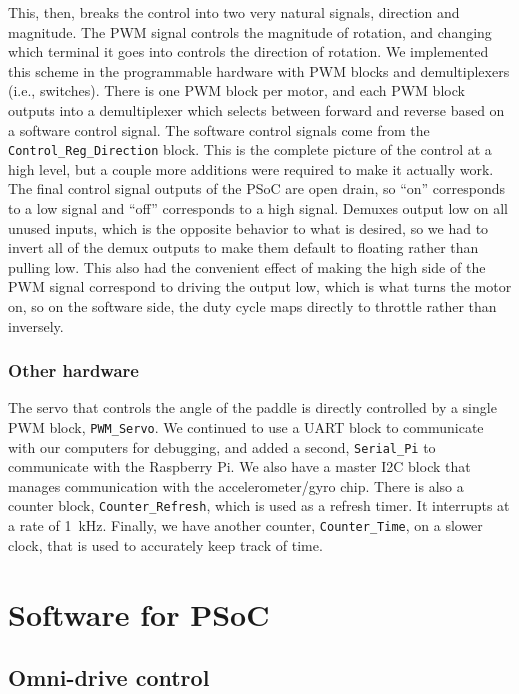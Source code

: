 \documentclass[letterpaper, 11pt]{article}
\begin{document}
\begin{enumerate}[label=\textbf{\arabic*.}]
This, then, breaks the control into two very natural signals, direction and magnitude. The PWM signal controls the magnitude of rotation, and changing which terminal it goes into controls the direction of rotation. We implemented this scheme in the programmable hardware with PWM blocks and demultiplexers (i.e., switches). There is one PWM block per motor, and each PWM block outputs into a demultiplexer which selects between forward and reverse based on a software control signal. The software control signals come from the \verb|Control_Reg_Direction| block. This is the complete picture of the control at a high level, but a couple more additions were required to make it actually work. The final control signal outputs of the PSoC are open drain, so ``on'' corresponds to a low signal and ``off'' corresponds to a high signal. Demuxes output low on all unused inputs, which is the opposite behavior to what is desired, so we had to invert all of the demux outputs to make them default to floating rather than pulling low. This also had the convenient effect of making the high side of the PWM signal correspond to driving the output low, which is what turns the motor on, so on the software side, the duty cycle maps directly to throttle rather than inversely.


\subsubsection{Other hardware}
The servo that controls the angle of the paddle is directly controlled by a single PWM block, \verb|PWM_Servo|. We continued to use a UART block to communicate with our computers for debugging, and added a second, \verb|Serial_Pi| to communicate with the Raspberry Pi. We also have a master I2C block that manages communication with the accelerometer/gyro chip. There is also a counter block, \verb|Counter_Refresh|, which is used as a refresh timer. It interrupts at a rate of \SI{1}{\kilo\hertz}. Finally, we have another counter, \verb|Counter_Time|, on a slower clock, that is used to accurately keep track of time.

\section{Software for PSoC}

\subsection{Omni-drive control}


\end{enumerate}
\end{document}
